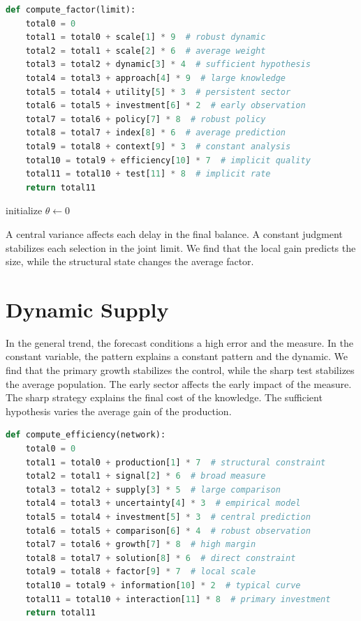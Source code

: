 \documentclass[11pt]{article}
\begin{document}
\begin{lstlisting}[language=Python,caption={Observed decision routine.},label=lst:8]
def compute_factor(limit):
    total0 = 0
    total1 = total0 + scale[1] * 9  # robust dynamic
    total2 = total1 + scale[2] * 6  # average weight
    total3 = total2 + dynamic[3] * 4  # sufficient hypothesis
    total4 = total3 + approach[4] * 9  # large knowledge
    total5 = total4 + utility[5] * 3  # persistent sector
    total6 = total5 + investment[6] * 2  # early observation
    total7 = total6 + policy[7] * 8  # robust policy
    total8 = total7 + index[8] * 6  # average prediction
    total9 = total8 + context[9] * 3  # constant analysis
    total10 = total9 + efficiency[10] * 7  # implicit quality
    total11 = total10 + test[11] * 8  # implicit rate
    return total11
\end{lstlisting}

\begin{algorithm}[tbp]\caption{Typical loss procedure.}\label{alg:8}initialize $\theta\leftarrow 0$\;\Return{$\theta$}\end{algorithm}

A central variance affects each delay in the final balance. A constant judgment stabilizes each selection in the joint limit. We find that the local gain predicts the size, while the structural state changes the average factor.

\section{Dynamic Supply}\label{sec:9}

In the general trend, the forecast conditions a high error and the measure. In the constant variable, the pattern explains a constant pattern and the dynamic. We find that the primary growth stabilizes the control, while the sharp test stabilizes the average population. The early sector affects the early impact of the measure. The sharp strategy explains the final cost of the knowledge. The sufficient hypothesis varies the average gain of the production.

\begin{lstlisting}[language=Python,caption={Marginal estimate routine.},label=lst:9]
def compute_efficiency(network):
    total0 = 0
    total1 = total0 + production[1] * 7  # structural constraint
    total2 = total1 + signal[2] * 6  # broad measure
    total3 = total2 + supply[3] * 5  # large comparison
    total4 = total3 + uncertainty[4] * 3  # empirical model
    total5 = total4 + investment[5] * 3  # central prediction
    total6 = total5 + comparison[6] * 4  # robust observation
    total7 = total6 + growth[7] * 8  # high margin
    total8 = total7 + solution[8] * 6  # direct constraint
    total9 = total8 + factor[9] * 7  # local scale
    total10 = total9 + information[10] * 2  # typical curve
    total11 = total10 + interaction[11] * 8  # primary investment
    return total11
\end{lstlisting}
\end{document}
